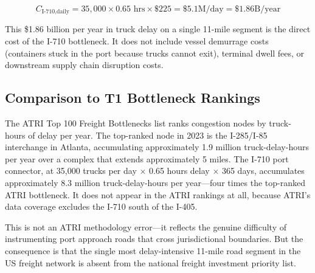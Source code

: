 \begin{equation}
  C_{\text{I-710,daily}} = 35,000 \times 0.65 \text{ hrs} \times \$225 = \$5.1 \text{M/day} = \$1.86 \text{B/year}
\end{equation}

This \$1.86 billion per year in truck delay on a single 11-mile segment is the direct cost of the I-710 bottleneck. It does not include vessel demurrage costs (containers stuck in the port because trucks cannot exit), terminal dwell fees, or downstream supply chain disruption costs.

\subsection{Comparison to T1 Bottleneck Rankings}

The ATRI Top 100 Freight Bottlenecks list \citep{ATRI_costs2024} ranks congestion nodes by truck-hours of delay per year. The top-ranked node in 2023 is the I-285/I-85 interchange in Atlanta, accumulating approximately 1.9 million truck-delay-hours per year over a complex that extends approximately 5 miles. The I-710 port connector, at 35,000 trucks per day $\times$ 0.65 hours delay $\times$ 365 days, accumulates approximately 8.3 million truck-delay-hours per year---four times the top-ranked ATRI bottleneck. It does not appear in the ATRI rankings at all, because ATRI's data coverage excludes the I-710 south of the I-405.

This is not an ATRI methodology error---it reflects the genuine difficulty of instrumenting port approach roads that cross jurisdictional boundaries. But the consequence is that the single most delay-intensive 11-mile road segment in the US freight network is absent from the national freight investment priority list.
